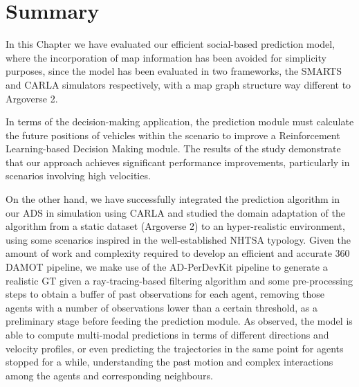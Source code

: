 \section{Summary}
\label{sec:8_summary}

In this Chapter we have evaluated our efficient social-based prediction model, where the incorporation of map information has been avoided for simplicity purposes, since the model has been evaluated in two frameworks, the \ac{SMARTS} and \ac{CARLA} simulators respectively, with a map graph structure way different to Argoverse 2.

In terms of the decision-making application, the prediction module must calculate the future positions of vehicles within the scenario to improve a Reinforcement Learning-based Decision Making module. The results of the study demonstrate that our approach achieves significant performance improvements, particularly in scenarios involving high velocities.

On the other hand, we have successfully integrated the prediction algorithm in our \ac{ADS} in simulation using CARLA and studied the domain adaptation of the algorithm from a static dataset (Argoverse 2) to an hyper-realistic environment, using some scenarios inspired in the well-established \ac{NHTSA} typology. Given the amount of work and complexity required to develop an efficient and accurate 360 \degree \ac{DAMOT} pipeline, we make use of the \ac{AD-PerDevKit} pipeline to generate a realistic \ac{GT} given a ray-tracing-based filtering algorithm and some pre-processing steps to obtain a buffer of past observations for each agent, removing those agents with a number of observations lower than a certain threshold, as a preliminary stage before feeding the prediction module. As observed, the model is able to compute multi-modal predictions in terms of different directions and velocity profiles, or even predicting the trajectories in the same point for agents stopped for a while, understanding the past motion and complex interactions among the agents and corresponding neighbours. 


